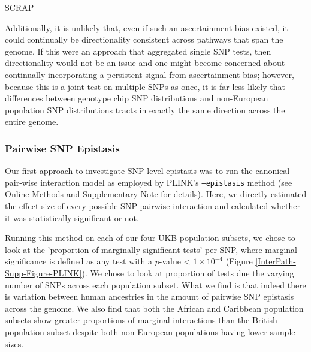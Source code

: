 \documentclass[12pt, a4paper]{article}
\begin{document}
\begingroup


\endgroup


\iffalse

SCRAP

Additionally, it is unlikely that, even if such an ascertainment bias existed, it could continually be directionality consistent across pathways that span the genome. If this were an approach that aggregated single SNP tests, then directionality would not be an issue and one might become concerned about continually incorporating a persistent signal from ascertainment bias; however, because this is a joint test on multiple SNPs as once, it is far less likely that differences between genotype chip SNP distributions and non-European population SNP distributions tracts in exactly the same direction across the entire genome.

\subsubsection{Pairwise SNP Epistasis}

Our first approach to investigate SNP-level epistasis was to run the canonical pair-wise interaction model as employed by PLINK's \texttt{--epistasis} method \citep{Purcell2007} (see Online Methods and Supplementary Note for details). Here, we directly estimated the effect size of every possible SNP pairwise interaction and calculated whether it was statistically significant or not.  

Running this method on each of our four UKB population subsets, we chose to look at the 'proportion of marginally significant tests' per SNP, where marginal significance is defined as any test with a $p$-value < $1\times10^{-4}$ (Figure \ref{InterPath-Supp-Figure-PLINK}). We chose to look at proportion of tests due the varying number of SNPs across each population subset. What we find is that indeed there is variation between human ancestries in the amount of pairwise SNP epistasis across the genome. We also find that both the African and Caribbean population subsets show greater proportions of marginal interactions than the British population subset despite both non-European populations having lower sample sizes. 
\end{document}
